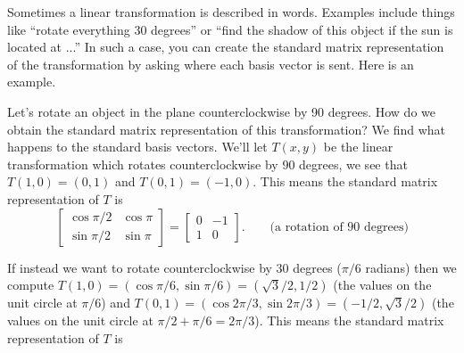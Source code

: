 Sometimes a linear transformation is described in words.  Examples include things like ``rotate everything 30 degrees'' or ``find the shadow of this object if the sun is located at ...''  In such a case, you can create the standard matrix representation of the transformation by asking where each basis vector is sent.  Here is an example.

\begin{example}
Let's rotate an object in the plane counterclockwise by 90 degrees. 
How do we obtain the standard matrix representation of this transformation? 
We find what happens to the standard basis vectors. 
We'll let $T(x,y)$ be the linear transformation which rotates counterclockwise by 90 degrees, we see that $T(1,0)=(0,1)$ and $T(0,1)=(-1,0)$.  
This means the standard matrix representation of $T$ is 
$$\begin{bmatrix}
\cos \pi/2&\cos\pi\\
\sin\pi/2&\sin\pi
\end{bmatrix}=\begin{bmatrix}0&-1\\1&0\end{bmatrix}. \quad\quad \text{(a rotation of 90 degrees)}$$

If instead we want to rotate counterclockwise by 30 degrees ($\pi/6$ radians)  then we compute 
$T(1,0) = (\cos \pi/6, \sin \pi/6) = (\sqrt3/2,1/2)$ (the values on the unit circle at $\pi/6$)  and 
$T(0,1) = (\cos 2\pi/3, \sin 2\pi/3) = (-1/2,\sqrt3/2) $ (the values on the unit circle at $\pi/2+\pi/6 = 2\pi/3$). 
This means the standard matrix representation of $T$ is 
\end{example}

